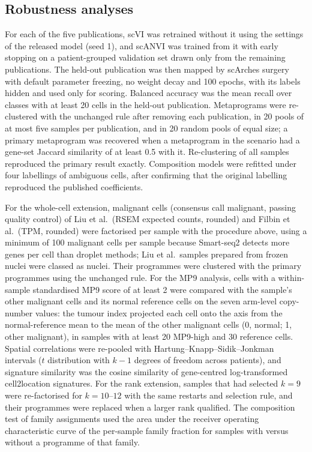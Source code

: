 \documentclass[11pt,a4paper]{article}
\begin{document}
\subsection{Robustness analyses}
For each of the five publications, scVI was retrained without it using the settings of the released model (seed 1), and
scANVI was trained from it with early stopping on a patient-grouped validation set drawn only from the remaining
publications. The held-out publication was then mapped by scArches surgery \citep{lotfollahi2021mapping} with default
parameter freezing, no weight decay and 100 epochs, with its labels hidden and used only for scoring. Balanced accuracy was
the mean recall over classes with at least 20 cells in the held-out publication. Metaprograms were re-clustered with the
unchanged rule after removing each publication, in 20 pools of at most five samples per publication, and in 20 random pools
of equal size; a primary metaprogram was recovered when a metaprogram in the scenario had a gene-set Jaccard similarity of at
least 0.5 with it. Re-clustering of all samples reproduced the primary result exactly. Composition models were refitted
under four labellings of ambiguous cells, after confirming that the original labelling reproduced the published
coefficients.

For the whole-cell extension, malignant cells (consensus call malignant, passing quality control) of Liu et al.\ (RSEM
expected counts, rounded) and Filbin et al.\ (TPM, rounded) were factorised per sample with the procedure above, using a
minimum of 100 malignant cells per sample because Smart-seq2 detects more genes per cell than droplet methods; Liu et al.\
samples prepared from frozen nuclei were classed as nuclei. Their programmes were clustered with the primary programmes
using the unchanged rule. For the MP9 analysis, cells with a within-sample standardised MP9 score of at least 2 were
compared with the sample's other malignant cells and its normal reference cells on the seven arm-level copy-number values:
the tumour index projected each cell onto the axis from the normal-reference mean to the mean of the other malignant cells
(0, normal; 1, other malignant), in samples with at least 20 MP9-high and 30 reference cells. Spatial correlations were
re-pooled with Hartung--Knapp--Sidik--Jonkman intervals ($t$ distribution with $k - 1$ degrees of freedom across patients),
and signature similarity was the cosine similarity of gene-centred log-transformed cell2location signatures. For the rank extension, samples that had selected $k = 9$ were re-factorised
for $k = 10$--$12$ with the same restarts and selection rule, and their programmes were replaced when a larger rank
qualified. The
composition test of family assignments used the area under the receiver operating characteristic curve of the per-sample
family fraction for samples with versus without a programme of that family.
\end{document}
